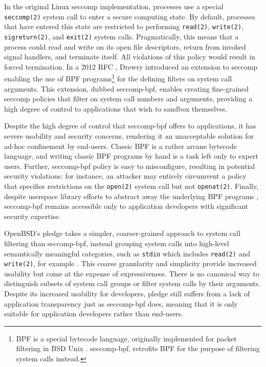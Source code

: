 \documentclass[dvipsnames, 12pt]{article}
\begin{document}
In the original Linux seccomp implementation, processes use a special
\texttt{seccomp(2)} system call to enter a secure computing state. By default,
processes that have entered this state are restricted to performing
\texttt{read(2)}, \texttt{write(2)}, \texttt{sigreturn(2)}, and \texttt{exit(2)}
system calls.  Pragmatically, this means that a process could read and write on
its open file descriptors, return from invoked signal handlers, and terminate
itself. All violations of this policy would result in forced termination. In
a 2012 RFC \cite{drewry2012_seccomp_bpf}, Drewry introduced an extension to
seccomp enabling the use of BPF programs\footnote{BPF is a special bytecode
language, originally implemented for packet filtering in BSD Unix
\cite{classic_bpf}. seccomp-bpf, retrofits BPF for the purpose of filtering
system calls instead.} for the defining filters on system call arguments. This
extension, dubbed seccomp-bpf, enables creating fine-grained seccomp policies
that filter on system call numbers and arguments, providing a high degree of
control to applications that wish to sandbox themselves.

Despite the high degree of control that seccomp-bpf offers to applications, it
has severe usability and security concerns, rendering it an unacceptable
solution for ad-hoc confinement by end-users. Classic BPF \cite{classic_bpf} is
a rather arcane bytecode language, and writing classic BPF programs by hand is
a task left only to expert users. Further, seccomp-bpf policy is easy to
misconfigure, resulting in potential security violations; for instance, an
attacker may entirely circumvent a policy that specifies restrictions on the
\texttt{open(2)} system call but not \texttt{openat(2)}. Finally, despite
userspace library efforts to abstract away the underlying BPF programs
\cite{libseccomp}, seccomp-bpf remains accessible only to application developers
with significant security expertise.

OpenBSD's pledge \cite{pledge} takes a simpler, coarser-grained approach to
system call filtering than seccomp-bpf, instead grouping system calls into
high-level semantically meaningful categories, such as \texttt{stdio} which
includes \texttt{read(2)} and \texttt{write(2)}, for example
\cite{anderson2017_comparison}. This coarse granularity and simplicity provide
increased usability but come at the expense of expressiveness. There is no
canonical way to distinguish subsets of system call groups or filter system
calls by their arguments.  Despite its increased usability for developers,
pledge still suffers from a lack of application transparency just as seccomp-bpf
does, meaning that it is only suitable for application developers rather than
end-users.
\end{document}
